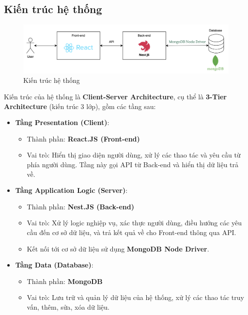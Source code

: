 \subsection{Kiến trúc hệ thống}
\begin{figure}[H]
    \centering
    \includegraphics[width=\linewidth]{DBMS-Application/Images/dbms-architecture.png}
    \caption{Kiến trúc hệ thống}
\end{figure}

Kiến trúc của hệ thống là \textbf{Client-Server Architecture}, cụ thể là \textbf{3-Tier Architecture} (kiến trúc 3 lớp), gồm các tầng sau:
\begin{itemize}
    \item \textbf{Tầng Presentation (Client)}:
    \begin{itemize}
        \item Thành phần: \textbf{React.JS (Front-end)}
        \item Vai trò: Hiển thị giao diện người dùng, xử lý các thao tác và yêu cầu từ phía người dùng. Tầng này gọi API từ Back-end và hiển thị dữ liệu trả về.
    \end{itemize}

    \item \textbf{Tầng Application Logic (Server)}:
    \begin{itemize}
        \item Thành phần: \textbf{Nest.JS (Back-end)}
        \item Vai trò: Xử lý logic nghiệp vụ, xác thực người dùng, điều hướng các yêu cầu đến cơ sở dữ liệu, và trả kết quả về cho Front-end thông qua API.
        \item Kết nối tới cơ sở dữ liệu sử dụng \textbf{MongoDB Node Driver}.
    \end{itemize}

    \item \textbf{Tầng Data (Database)}:
    \begin{itemize}
        \item Thành phần: \textbf{MongoDB}
        \item Vai trò: Lưu trữ và quản lý dữ liệu của hệ thống, xử lý các thao tác truy vấn, thêm, sửa, xóa dữ liệu.
    \end{itemize}
\end{itemize}

